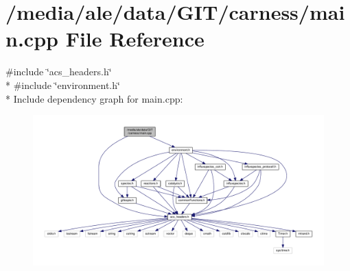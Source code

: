 \hypertarget{a00081}{\section{/media/ale/data/\-G\-I\-T/carness/main.cpp File Reference}
\label{a00081}
}
{\ttfamily \#include \char`\"{}acs\-\_\-headers.\-h\char`\"{}}\\*
{\ttfamily \#include \char`\"{}environment.\-h\char`\"{}}\\*
Include dependency graph for main.\-cpp\-:\nopagebreak
\begin{figure}[H]
\begin{center}
\leavevmode
\includegraphics[width=350pt]{a00154}
\end{center}
\end{figure}
